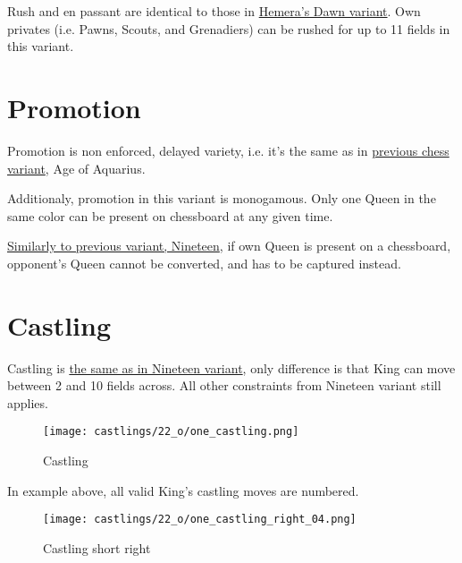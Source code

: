 Rush and en passant are identical to those in
\hyperref[fig:14_hemera_s_dawn_en_passant]{Hemera's Dawn variant}.
Own privates (i.e. Pawns, Scouts, and Grenadiers) can be rushed for up to 11
fields in this variant.

\clearpage %

\section*{Promotion}
\label{sec:One/Promotion}

Promotion is non enforced, delayed variety, i.e. it's the same as in
\hyperref[sec:Age of Aquarius/Promotion]{previous chess variant}, Age of Aquarius.

Additionaly, promotion in this variant is monogamous. Only one Queen
in the same color can be present on chessboard at any given time.

\hyperref[fig:scn_n_22_only_one_queen]{Similarly to previous variant, Nineteen},
if own Queen is present on a chessboard, opponent's Queen cannot be
converted, and has to be captured instead.

\clearpage %

\section*{Castling}
\label{sec:One/Castling}

Castling is
\hyperref[sec:Nineteen/Castling]{the same as in Nineteen variant},
only difference is that King can move
between 2 and 10 fields across. All other constraints from Nineteen variant still
applies.

\noindent
\begin{figure}[!h]
\texttt{[image: castlings/22\_o/one\_castling.png]}
\caption{Castling}
\label{fig:one_castling}
\end{figure}

In example above, all valid King's castling moves are numbered.

\noindent
\begin{figure}[!h]
\texttt{[image: castlings/22\_o/one\_castling\_right\_04.png]}
\caption{Castling short right}
\label{fig:one_castling_right_04}
\end{figure}

